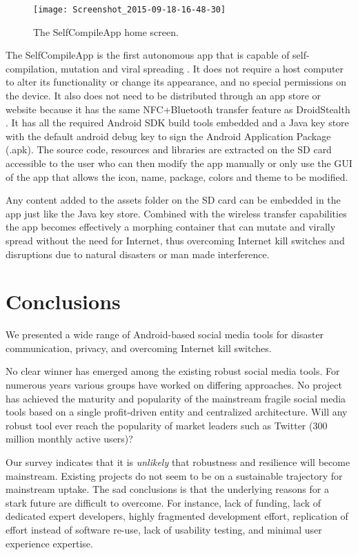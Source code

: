 \documentclass[conference,compsoc]{IEEEtran}
\begin{document}
\begin{figure}[b!]
\centering
\texttt{[image: Screenshot\_2015-09-18-16-48-30]}
\caption{The SelfCompileApp home screen.}
\label{fig_selfcompileapp}
\end{figure}

The SelfCompileApp is the first autonomous app that is capable of self-compilation, mutation and viral spreading \cite{brussee2015autonomous}.
It does not require a host computer to alter its functionality or change its appearance, and no special permissions on the device.
It also does not need to be distributed through an app store or website because it has the same NFC+Bluetooth transfer feature as DroidStealth \cite{hokke2015droidstealth}.
It has all the required Android SDK build tools embedded and a Java key store with the default android debug key to sign the Android Application Package (.apk).
The source code, resources and libraries are extracted on the SD card accessible to the user who can then modify the app manually or only use the GUI of the app that allows the icon, name, package, colors and theme to be modified.

Any content added to the assets folder on the SD card can be embedded in the app just like the Java key store.
Combined with the wireless transfer capabilities the app becomes effectively a morphing container that can mutate and virally spread without the need for Internet, thus overcoming Internet kill switches and disruptions due to natural disasters or man made interference.


\section{Conclusions}

We presented a wide range of Android-based social media tools for disaster
communication, privacy, and overcoming Internet kill switches.

No clear winner has emerged among the existing robust social media tools.
For numerous years various groups have worked on differing approaches.
No project has achieved the maturity and popularity of the mainstream fragile
social media tools based on a single profit-driven entity and centralized
architecture. 
Will any robust tool ever reach the popularity of market leaders such as Twitter (300 million
monthly active users)?

Our survey indicates that it is \emph{unlikely} that robustness and resilience will become mainstream.
Existing projects do not seem to be on a sustainable trajectory for mainstream uptake.
The sad conclusions is that the underlying reasons for a stark future are difficult to overcome.
For instance, lack of funding, lack of dedicated expert developers, highly fragmented development effort,
replication of effort instead of software re-use, lack of usability testing, and minimal user experience expertise. 




\end{document}
